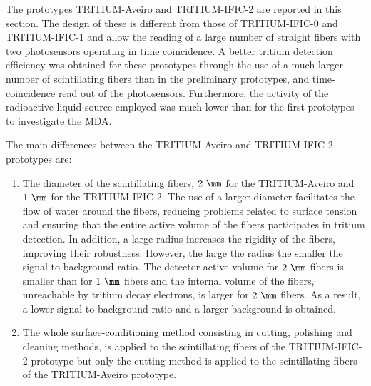 The prototypes TRITIUM-Aveiro and TRITIUM-IFIC-2 are reported in this section. The design of these is different from those of TRITIUM-IFIC-0 and TRITIUM-IFIC-1 and allow the reading of a large number of straight fibers with two photosensors operating in time coincidence. A better tritium detection efficiency was obtained for these prototypes through the use of a much larger number of scintillating fibers than in the preliminary prototypes, and time-coincidence read out of the photosensors. Furthermore, the activity of the radioactive liquid source employed was much lower than for the first prototypes to investigate the MDA. 

The main differences between the TRITIUM-Aveiro and TRITIUM-IFIC-2 prototypes are:

\begin{enumerate}

\item{} The diameter of the scintillating fibers, $2~\mm$ for the TRITIUM-Aveiro and $1~\mm$ for the TRITIUM-IFIC-2. The use of a larger diameter facilitates the flow of water around the fibers, reducing problems related to surface tension and ensuring that the entire active volume of the fibers participates in tritium detection. In addition, a large radius increases the rigidity of the fibers, improving their robustness. However, the large the radius the smaller the signal-to-background ratio. The detector active volume for $2~\mm$ fibers is smaller than for $1~\mm$ fibers and the internal volume of the fibers, unreachable by tritium decay electrons, is larger for $2~\mm$ fibers. As a result, a lower signal-to-background ratio and a larger background is obtained.


\item{} The whole surface-conditioning method consisting in cutting, polishing and cleaning methods, is applied to the scintillating fibers of the TRITIUM-IFIC-2 prototype but only the cutting method is applied to the scintillating fibers of the TRITIUM-Aveiro prototype.


\end{enumerate}
